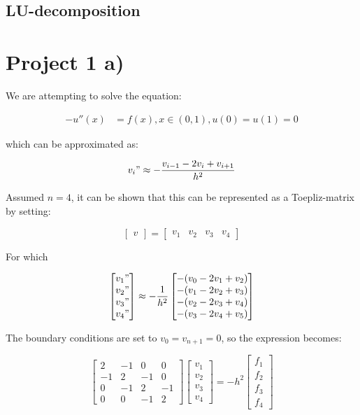 \documentclass{article}
\begin{document}
\subsection{LU-decomposition}



\section{Project 1 a)}

We are attempting to solve the equation: 

\begin{align*}
	-u''(x) & = f(x), x \in (0, 1), u(0) = u(1) = 0
\end{align*}

which can be approximated as:

\begin{equation}
	v_i" \approx -\frac{v_{i-1}- 2v_i + v_{i+1}}{h^2}
\end{equation}

Assumed $n= 4$, it can be shown that this can be represented as a Toepliz-matrix by setting: 

\[
\begin{bmatrix}
	v
\end{bmatrix}
=
\begin{bmatrix}
	 v_1 & v_2 & v_3 & v_4
\end{bmatrix}
\]

For which 

\[
\begin{bmatrix}
	v_1" \\  v_2" \\ v_3" \\ v_4"
\end{bmatrix}
	\approx -\frac{1}{h^2}
\begin{bmatrix}
	-(v_{0} -2v_1 +v_2) \\
	-(v_1 -2v_2 +v_3) \\
	-(v_{2} -2v_3 +v_4) \\
	-(v_{3} -2v_4 +v_5) 
\end{bmatrix}
\]

The boundary conditions are set to $v_0 = v_{n+1} = 0$, so the expression becomes: 

\[
\begin{bmatrix}
	2 & -1 & 0 & 0 \\
	-1 & 2 & -1 & 0 \\
	0 & -1 & 2 & -1 \\
	0 & 0 & -1 & 2
\end{bmatrix}
\begin{bmatrix}
	v_1 \\  v_2 \\ v_3 \\ v_4
\end{bmatrix}
	= -h^2
\begin{bmatrix}
	f_1 \\
	f_2 \\
	f_3 \\
	f_4
\end{bmatrix}
\]
\end{document}
